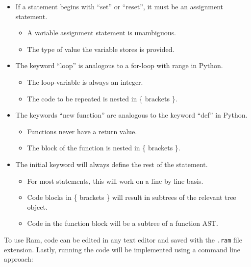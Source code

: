 \documentclass[fontsize=11pt]{article}
\begin{document}
\begin{itemize}
    \item If a statement begins with ``set'' or ``reset'', it must be an assignment statement.
    
    \begin{itemize}
        \item A variable assignment statement is unambiguous.
        \item The type of value the variable stores is provided.
    \end{itemize}
    
    \item The keyword ``loop'' is analogous to a for-loop with range in Python.
    
    \begin{itemize}
        \item The loop-variable is always an integer.
        \item The code to be repeated is nested in \{ brackets \}.
    \end{itemize}
    
    \item The keywords ``new function'' are analogous to the keyword ``def'' in Python.
    
    \begin{itemize}
        \item Functions never have a return value.
        \item The block of the function is nested in \{ brackets \}.
    \end{itemize}
    
    \item The initial keyword will always define the rest of the statement.
    
    \begin{itemize}
        \item For most statements, this will work on a line by line basis.
        \item Code blocks in \{ brackets \} will result in subtrees of the relevant tree object.
        \item Code in the function block will be a subtree of a function AST.
    \end{itemize}
    
\end{itemize}

To use Ram, code can be edited in any text editor and saved with the \texttt{.ram} file extension. Lastly, running the code will be implemented using a command line approach:
\end{document}
